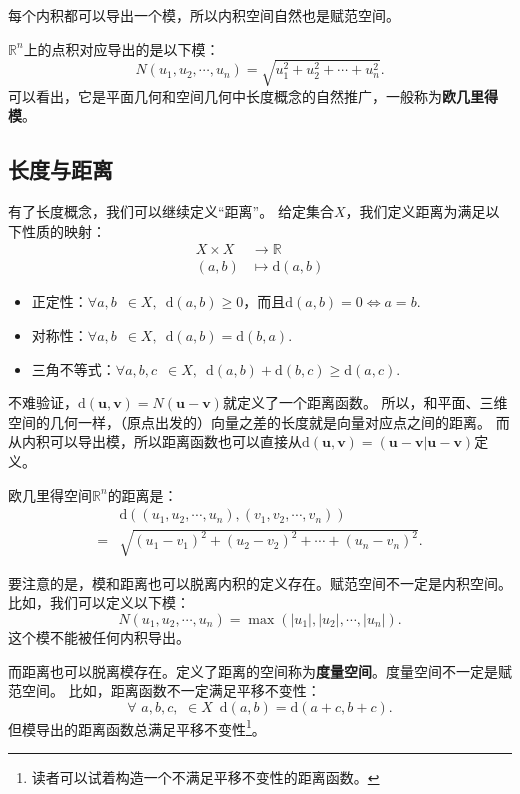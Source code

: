 \documentclass[12pt,UTF8,fontset=none]{ctexbook}
\begin{document}
每个内积都可以导出一个模，所以内积空间自然也是赋范空间。

$\mathbb{R}^n$上的点积对应导出的是以下模：
$$ N(u_1, u_2, \cdots , u_n) = \sqrt{u_1^2 + u_2^2 + \cdots + u_n^2}. $$
可以看出，它是平面几何和空间几何中长度概念的自然推广，一般称为\textbf{欧几里得模}。

\subsection{长度与距离}
有了长度概念，我们可以继续定义“距离”。
给定集合$X$，我们定义距离为满足以下性质的映射：
\begin{align*}
    X \times X &\rightarrow \mathbb{R}  \\
   (a, b) &\mapsto \mathrm{d}(a, b)
\end{align*}
\begin{itemize}
    \item 正定性：$ \forall a, b \,\,\, \in X, \,\,\, \mathrm{d}(a, b) \geqslant 0$，而且$\mathrm{d}(a, b) = 0 \Leftrightarrow a = b.$
    \item 对称性：$ \forall a, b \,\,\, \in X, \,\,\, \mathrm{d}(a, b) = \mathrm{d}(b, a).$
    \item 三角不等式：$ \forall a, b, c \,\,\, \in X, \,\,\, \mathrm{d}(a, b) + \mathrm{d}(b, c) \geqslant \mathrm{d}(a, c).$
\end{itemize}
不难验证，$\mathrm{d}(\mathbf{u}, \mathbf{v}) = N(\mathbf{u} - \mathbf{v})$就定义了一个距离函数。
所以，和平面、三维空间的几何一样，（原点出发的）向量之差的长度就是向量对应点之间的距离。
而从内积可以导出模，所以距离函数也可以直接从$\mathrm{d}(\mathbf{u}, \mathbf{v}) = (\mathbf{u} - \mathbf{v}|\mathbf{u} - \mathbf{v})$定义。

欧几里得空间$\mathbb{R}^n$的距离是：
\begin{align*}
    &\mathrm{d}\left((u_1, u_2, \cdots , u_n), (v_1, v_2, \cdots , v_n) \right)  \\
  = &\sqrt{(u_1-v_1)^2 + (u_2-v_2)^2 + \cdots + (u_n-v_n)^2}. 
\end{align*}

要注意的是，模和距离也可以脱离内积的定义存在。赋范空间不一定是内积空间。
比如，我们可以定义以下模：
$$ N(u_1, u_2, \cdots , u_n) = \max\left(|u_1|, |u_2|, \cdots, |u_n|\right). $$
这个模不能被任何内积导出。

而距离也可以脱离模存在。定义了距离的空间称为\textbf{度量空间}。度量空间不一定是赋范空间。
比如，距离函数不一定满足平移不变性：
$$ \forall \,\, a, b, c, \,\, \in X \,\,\, \mathrm{d}(a, b) = \mathrm{d}(a + c, b + c). $$
但模导出的距离函数总满足平移不变性\footnote{读者可以试着构造一个不满足平移不变性的距离函数。}。
\end{document}
